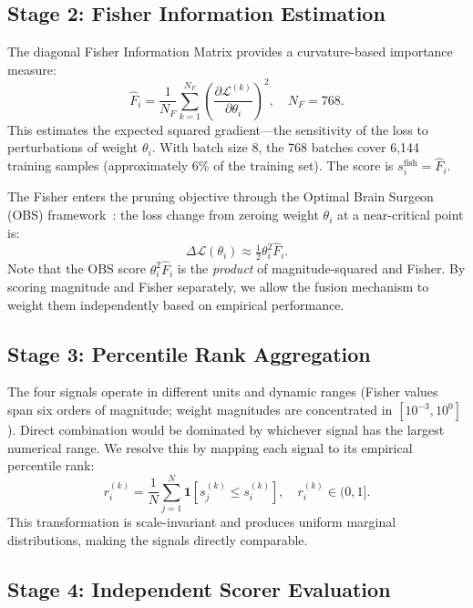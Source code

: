 \documentclass[journal]{IEEEtran}
\begin{document}
\subsection{Stage 2: Fisher Information Estimation}

The diagonal Fisher Information Matrix provides a curvature-based
importance measure:
\begin{equation}
  \hat{F}_i = \frac{1}{N_F}\sum_{k=1}^{N_F}
  \left(\frac{\partial \mathcal{L}^{(k)}}{\partial \theta_i}\right)^{2},
  \quad N_F = 768.
  \label{eq:fisher}
\end{equation}
This estimates the expected squared gradient---the sensitivity
of the loss to perturbations of weight $\theta_i$.
With batch size 8, the 768 batches cover 6,144 training samples
(approximately 6\% of the training set).
The score is $s_i^{\text{fish}} = \hat{F}_i$.

The Fisher enters the pruning objective through the Optimal
Brain Surgeon (OBS) framework~\cite{Hassibi1993}: the loss
change from zeroing weight $\theta_i$ at a near-critical
point is:
\begin{equation}
  \Delta \mathcal{L}(\theta_i) \approx
  \tfrac{1}{2}\theta_i^2 \hat{F}_i.
  \label{eq:obs}
\end{equation}
Note that the OBS score $\theta_i^2 \hat{F}_i$ is the
\emph{product} of magnitude-squared and Fisher.
By scoring magnitude and Fisher separately, we allow the fusion
mechanism to weight them independently based on empirical
performance.

\subsection{Stage 3: Percentile Rank Aggregation}

The four signals operate in different units and dynamic ranges
(Fisher values span six orders of magnitude; weight magnitudes
are concentrated in $[10^{-3}, 10^{0}]$).
Direct combination would be dominated by whichever signal has
the largest numerical range.
We resolve this by mapping each signal to its empirical
percentile rank:
\begin{equation}
  r_i^{(k)} = \frac{1}{N}\sum_{j=1}^{N}
  \mathbf{1}\!\left[s_j^{(k)} \leq s_i^{(k)}\right],
  \quad r_i^{(k)} \in (0, 1].
  \label{eq:rank}
\end{equation}
This transformation is scale-invariant and produces uniform
marginal distributions, making the signals directly comparable.

\subsection{Stage 4: Independent Scorer Evaluation}
\end{document}
